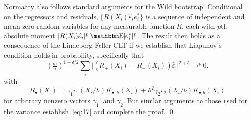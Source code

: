 \documentclass[12pt,fleqn]{article}
\begin{document}
Normality also follows standard arguments for the Wild
bootstrap. Conditional on the regressors and residuals,
$\{R(X_i) \hat\varepsilon_i e_i^* \}$ is a sequence of independent and
mean zero random variables for any measurable function $R$, each with
$p$th absolute moment
$\lvert R(X_i) \hat\varepsilon_i \rvert^p \E \lvert e_i^*
\rvert^{p}$.
The result then holds as a consequence of the Lindeberg-Feller CLT if
we establish that Liapunov's condition holds in probability, specifically that
\begin{equation}\label{eq:17}
  (\tfrac{m}{n})^{1+\delta/2} \sum_{i} \lvert (R_+(X_i) - R_-(X_i))
  \hat\varepsilon_i \rvert^{2+\delta} \to^{p} 0.
\end{equation}
with
\begin{equation*}
  R_\bullet(X_i) = \gamma_1 r_1(X_i/h) K_{\bullet,h}(X_i) + h^2 \gamma_2 r_2(X_i/b) K_{\bullet,b}(X_i)
\end{equation*}
for arbitrary nonzero vectors $\gamma_1'$ and $\gamma_2$.
\citep[See, for example,][Proposition 2.27 and Theorem 23.4.]{VDV00}
But similar arguments to those used for the variance establish~\eqref{eq:17}
and complete the proof. \qed

\clearpage


\end{document}
